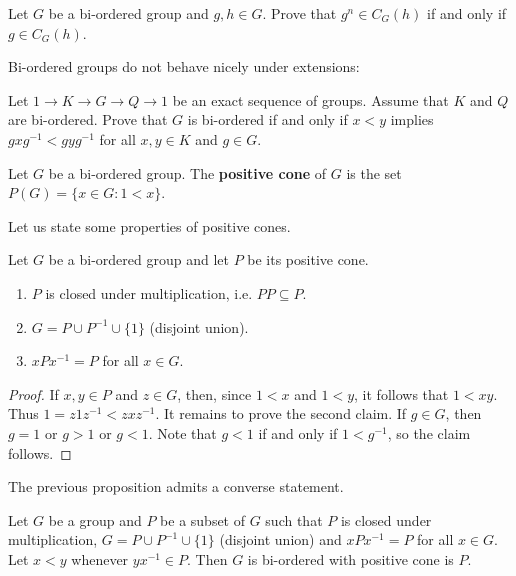 \begin{exercise}
    Let $G$ be a bi-ordered group and $g,h\in G$. Prove that $g^n\in C_G(h)$ if 
    and only if $g\in C_G(h)$.
\end{exercise}

Bi-ordered groups do not behave nicely under extensions:

\begin{exercise}
\label{xca:BO_sequence}
    Let $1\to K\to G\to Q\to 1$ be an exact sequence of groups. Assume that $K$ and $Q$ 
    are bi-ordered. Prove that $G$ is bi-ordered if and only if 
    $x<y$ implies $gxg^{-1}<gyg^{-1}$ for all $x,y\in K$ and $g\in G$. 
\end{exercise}

\begin{definition}
	Let $G$ be a bi-ordered group. The \textbf{positive cone} of $G$  
	is the set $P(G)=\{x\in
	G:1<x\}$.
\end{definition}

Let us state some properties of positive cones. 

\begin{proposition}
	\label{pro:biordenableP1}
	Let $G$ be a bi-ordered group and let $P$ be its positive cone. 
	\begin{enumerate}
		\item $P$ is closed under multiplication, i.e. $PP\subseteq P$. 
		\item $G=P\cup P^{-1}\cup \{1\}$ (disjoint union).
		\item $xPx^{-1}=P$ for all $x\in G$.
	\end{enumerate}
\end{proposition}

\begin{proof}
	If $x,y\in P$ and $z\in G$, then, since $1<x$ and $1<y$, it follows that 
	$1<xy$.  Thus $1=z1z^{-1}<zxz^{-1}$. It remains to prove the second claim.  
	If $g\in G$, then $g=1$ or $g>1$ or $g<1$. Note that $g<1$ if and only if 
	$1<g^{-1}$, so the claim follows. 
\end{proof}

The previous proposition admits a converse statement. 

\begin{proposition}
	\label{pro:biordenableP2}
	Let $G$ be a group and $P$ be a subset of $G$ such that 
	$P$ is closed under multiplication, $G=P\cup P^{-1}\cup \{1\}$ (disjoint union) and
	$xPx^{-1}=P$ for all $x\in G$. Let $x<y$ whenever  
	$yx^{-1}\in P$. Then $G$ is bi-ordered with positive
	cone is $P$.
\end{proposition}

